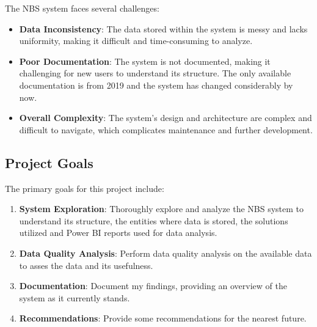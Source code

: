 The NBS system faces several challenges:
\begin{itemize}
	\item \textbf{Data Inconsistency}: The data stored within the system is messy and lacks uniformity, making it difficult and time-consuming to analyze.
	\item \textbf{Poor Documentation}: The system is not documented, making it challenging for new users to understand its structure. The only available documentation is from 2019 and the system has changed considerably by now.
	\item \textbf{Overall Complexity}: The system's design and architecture are complex and difficult to navigate, which complicates maintenance and further development.
\end{itemize}

\subsection{Project Goals}
The primary goals for this project include:
\begin{enumerate}
	\item \textbf{System Exploration}: Thoroughly explore and analyze the NBS system to understand its structure, the entities where data is stored, the solutions utilized and Power BI reports used for data analysis.
	\item \textbf{Data Quality Analysis}: Perform data quality analysis on the available data to asses the data and its usefulness.
	\item \textbf{Documentation}: Document my findings, providing an overview of the system as it currently stands.
	\item \textbf{Recommendations}: Provide some recommendations for the nearest future.
\end{enumerate}